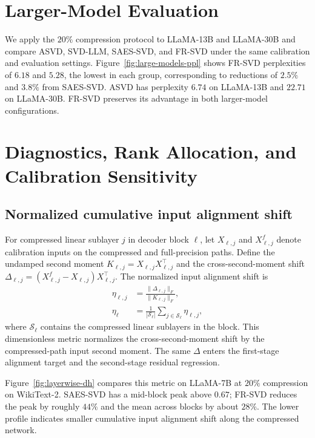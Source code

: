 \section{Larger-Model Evaluation}\label{app:full-results}\label{app:large-models}

We apply the $20\%$ compression protocol to LLaMA-13B and LLaMA-30B and compare ASVD, SVD-LLM, SAES-SVD, and FR-SVD under the same calibration and evaluation settings. Figure~\ref{fig:large-models-ppl} shows FR-SVD perplexities of $6.18$ and $5.28$, the lowest in each group, corresponding to reductions of $2.5\%$ and $3.8\%$ from SAES-SVD. ASVD has perplexity $6.74$ on LLaMA-13B and $22.71$ on LLaMA-30B. FR-SVD preserves its advantage in both larger-model configurations.



\section{Diagnostics, Rank Allocation, and Calibration Sensitivity}\label{app:diagnostics}

\subsection{Normalized cumulative input alignment shift}\label{app:input-shift}
For compressed linear sublayer $j$ in decoder block $\ell$, let $X_{\ell,j}$ and $X_{\ell,j}^f$ denote calibration inputs on the compressed and full-precision paths. Define the undamped second moment $K_{\ell,j}=X_{\ell,j}X_{\ell,j}^\top$ and the cross-second-moment shift $\Delta_{\ell,j}=(X_{\ell,j}^f-X_{\ell,j})X_{\ell,j}^\top$. The normalized input alignment shift is
\begin{equation}
\begin{aligned}
\eta_{\ell,j}&=\frac{\|\Delta_{\ell,j}\|_F}{\|K_{\ell,j}\|_F},\\
\eta_\ell&=\frac1{|\mathcal S_\ell|}\sum_{j\in\mathcal S_\ell}\eta_{\ell,j},
\end{aligned}
\label{eq:app-input-shift}
\end{equation}
where $\mathcal S_\ell$ contains the compressed linear sublayers in the block. This dimensionless metric normalizes the cross-second-moment shift by the compressed-path input second moment. The same $\Delta$ enters the first-stage alignment target and the second-stage residual regression.

Figure~\ref{fig:layerwise-dh} compares this metric on LLaMA-7B at $20\%$ compression on WikiText-2. SAES-SVD has a mid-block peak above $0.67$; FR-SVD reduces the peak by roughly $44\%$ and the mean across blocks by about $28\%$. The lower profile indicates smaller cumulative input alignment shift along the compressed network.

